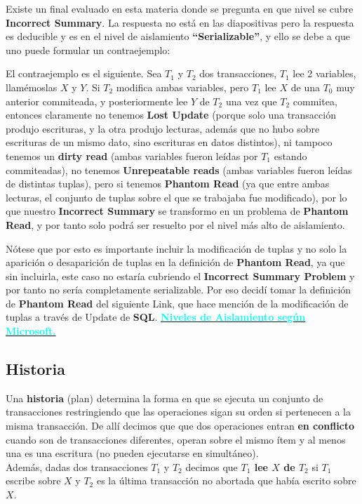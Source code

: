 Existe un final evaluado en esta materia donde se pregunta en que nivel se cubre \textbf{Incorrect Summary}. La respuesta no está en las diapositivas pero la respuesta es deducible y es en el nivel de aislamiento \textbf{``Serializable''}, y ello se debe a que uno puede formular un contraejemplo:

El contraejemplo es el siguiente. Sea $T_1$ y $T_2$ dos transacciones, $T_1$ lee 2 variables, llamémoslas $X$ y $Y$. Si $T_2$ modifica ambas variables, pero $T_1$ lee $X$ de una $T_0$ muy anterior commiteada, y posteriormente lee $Y$ de $T_2$ una vez que $T_2$ commitea, entonces claramente no tenemos \textbf{Lost Update} (porque solo una transacción produjo escrituras, y la otra produjo lecturas, además que no hubo sobre escrituras de un mismo dato, sino escrituras en datos distintos), ni tampoco tenemos un \textbf{dirty read} (ambas variables fueron leídas por $T_1$ estando commiteadas), no tenemos \textbf{Unrepeatable reads} (ambas variables fueron leídas de distintas tuplas), pero si tenemos \textbf{Phantom Read} (ya que entre ambas lecturas, el conjunto de tuplas sobre el que se trabajaba fue modificado), por lo que nuestro \textbf{Incorrect Summary} se transformo en un problema de \textbf{Phantom Read}, y por tanto solo podrá ser resuelto por el nivel más alto de aislamiento. 

Nótese que por esto es importante incluir la modificación de tuplas y no solo la aparición o desaparición de tuplas en la definición de \textbf{Phantom Read}, ya que sin incluirla, este caso no estaría cubriendo el \textbf{Incorrect Summary Problem} y por tanto no sería completamente serializable. Por eso decidí tomar la definición de \textbf{Phantom Read} del siguiente Link, que hace mención de la modificación de tuplas a través de Update de \textbf{SQL}. \href{https://docs.microsoft.com/en-us/sql/odbc/reference/develop-app/transaction-isolation-levels?view=sql-server-ver16}{\textbf{\textcolor{cyan}{Niveles de Aislamiento según Microsoft.}}}

\subsection*{Historia}
Una \textbf{historia} (plan) determina la forma en que se ejecuta un conjunto de transacciones restringiendo que las operaciones sigan su orden si pertenecen a la misma transacción. De allí decimos que que dos operaciones entran \textbf{en conflicto} cuando son de transacciones diferentes, operan sobre el mismo ítem y al menos una es una escritura (no pueden ejecutarse en simultáneo). \\
Además, dadas dos transacciones $T_1$ y $T_2$ decimos que \textbf{$T_1$ lee $X$ de $T_2$} si $T_1$ escribe sobre $X$ y $T_2$ es la última transacción no abortada que había escrito sobre $X$.


